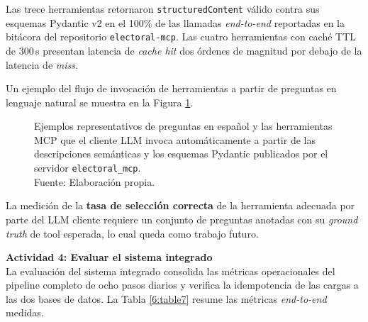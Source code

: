 Las trece herramientas retornaron \texttt{structuredContent} válido contra sus
esquemas Pydantic v2 en el 100\% de las llamadas \textit{end-to-end} reportadas
en la bitácora del repositorio \texttt{electoral-mcp}. Las cuatro herramientas con
caché TTL de 300\,s presentan latencia de \textit{cache hit} dos órdenes de
magnitud por debajo de la latencia de \textit{miss}.

Un ejemplo del flujo de invocación de herramientas a partir de preguntas en
lenguaje natural se muestra en la Figura \ref{6:fig9}.

\begin{figure}[!ht]
    \begin{center}
        \resizebox{0.85\textwidth}{!}{}
        \caption[Ejemplos de preguntas en lenguaje natural y herramientas MCP invocadas]{Ejemplos representativos de preguntas en español y las herramientas MCP que el cliente LLM invoca automáticamente a partir de las descripciones semánticas y los esquemas Pydantic publicados por el servidor \texttt{electoral\_mcp}.\\Fuente: Elaboración propia.}
        \label{6:fig9}
    \end{center}
\end{figure}

La medición de la \textbf{tasa de selección correcta} de la herramienta adecuada
por parte del LLM cliente requiere un conjunto de preguntas anotadas con su
\textit{ground truth} de tool esperada, lo cual queda como trabajo futuro.

\vspace{0.5cm}
\textbf{Actividad 4: Evaluar el sistema integrado}
\\
La evaluación del sistema integrado consolida las métricas operacionales del
pipeline completo de ocho pasos diarios y verifica la idempotencia de las cargas
a las dos bases de datos. La Tabla \ref{6:table7} resume las métricas
\textit{end-to-end} medidas.

